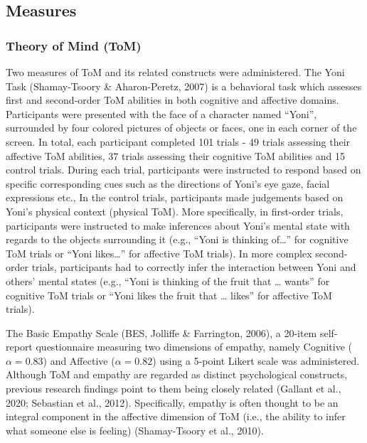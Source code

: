 \documentclass[
  man,mask,floatsintext]{apa6}
\begin{document}
\hypertarget{measures}{%
\subsection{Measures}\label{measures}}

\hypertarget{theory-of-mind-tom}{%
\subsubsection{Theory of Mind (ToM)}\label{theory-of-mind-tom}}

Two measures of ToM and its related constructs were administered. The Yoni Task (Shamay-Tsoory \& Aharon-Peretz, 2007) is a behavioral task which assesses first and second-order ToM abilities in both cognitive and affective domains. Participants were presented with the face of a character named ``Yoni'', surrounded by four colored pictures of objects or faces, one in each corner of the screen. In total, each participant completed 101 trials - 49 trials assessing their affective ToM abilities, 37 trials assessing their cognitive ToM abilities and 15 control trials. During each trial, participants were instructed to respond based on specific corresponding cues such as the directions of Yoni's eye gaze, facial expressions etc., In the control trials, participants made judgements based on Yoni's physical context (physical ToM). More specifically, in first-order trials, participants were instructed to make inferences about Yoni's mental state with regards to the objects surrounding it (e.g., ``Yoni is thinking of\ldots{}'' for cognitive ToM trials or ``Yoni likes\ldots{}'' for affective ToM trials). In more complex second-order trials, participants had to correctly infer the interaction between Yoni and others' mental states (e.g., ``Yoni is thinking of the fruit that \ldots{} wants'' for cognitive ToM trials or ``Yoni likes the fruit that \ldots{} likes'' for affective ToM trials).

The Basic Empathy Scale (BES, Jolliffe \& Farrington, 2006), a 20-item self-report questionnaire measuring two dimensions of empathy, namely Cognitive (\(\alpha = 0.83\)) and Affective (\(\alpha = 0.82\)) using a 5-point Likert scale was administered. Although ToM and empathy are regarded as distinct psychological constructs, previous research findings point to them being closely related (Gallant et al., 2020; Sebastian et al., 2012). Specifically, empathy is often thought to be an integral component in the affective dimension of ToM (i.e., the ability to infer what someone else is feeling) (Shamay-Tsoory et al., 2010).
\end{document}
